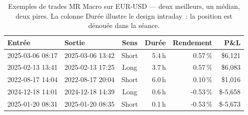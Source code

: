 \begin{table}[H]
\centering
\caption{Exemples de trades MR Macro sur EUR-USD — deux meilleurs, un médian, deux pires. La colonne Durée illustre le design intraday~: la position est dénouée dans la séance.}
\label{tab:trades_mr_macro}
\begin{tabular}{llcrrr}
\toprule
Entrée & Sortie & Sens & Durée & Rendement & P\&L \\
\midrule
2025-03-06 08:17 & 2025-03-06 13:42 & Short & 5.4\,h & 0.57\,\% & \$6,121 \\
2025-02-13 13:41 & 2025-02-13 17:25 & Long & 3.7\,h & 0.57\,\% & \$6,083 \\
2022-08-17 14:04 & 2022-08-17 20:04 & Short & 6.0\,h & 0.10\,\% & \$1,016 \\
2024-12-18 14:01 & 2024-12-18 14:39 & Long & 0.6\,h & -0.53\,\% & \$-5,658 \\
2025-01-20 08:31 & 2025-01-20 08:35 & Short & 0.1\,h & -0.53\,\% & \$-5,673 \\
\bottomrule
\end{tabular}
\end{table}
